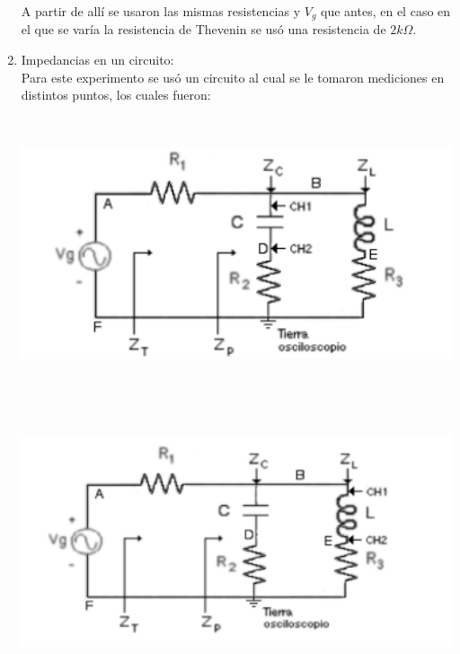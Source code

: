 \documentclass[12pt]{article}
\begin{document}
\begin{enumerate}
		A partir de allí se usaron las mismas resistencias y $V_g$ que antes, en el caso en el que se varía la resistencia de Thevenin se usó una resistencia de $2k\Omega$.
		
		\item Impedancias en un circuito:\\
		
		Para este experimento se usó un circuito al cual se le tomaron mediciones en distintos puntos, los cuales fueron:\\
		
		\begin{center}
			\includegraphics[width=16cm,height=8cm]{Img/circ_4}
		\end{center}
		
		\begin{center}
			\includegraphics[width=16cm,height=8cm]{Img/circ_5}
		\end{center}
		

\end{enumerate}
\end{document}
